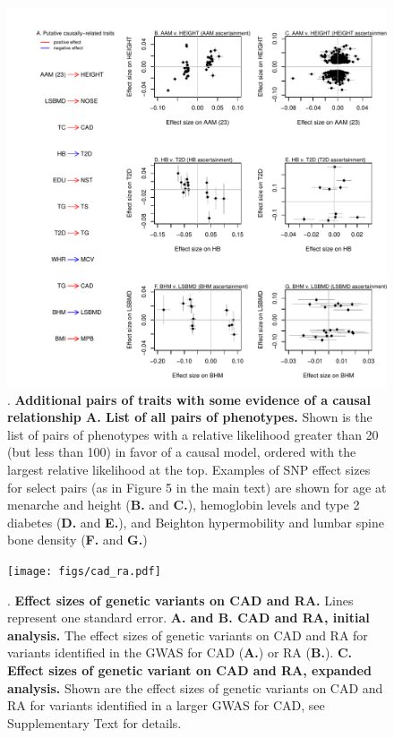 \documentclass[11pt,titlepage]{article}
\begin{document}
\begin{figure}
\begin{center}
\includegraphics[scale = 0.8]{figs/causal_supp.pdf}
\caption{. \textbf{Additional pairs of traits with some evidence of a causal relationship A. List of all pairs of phenotypes.} Shown is the list of pairs of phenotypes with a relative likelihood greater than 20 (but less than 100) in favor of a causal model, ordered with the largest relative likelihood at the top. Examples of SNP effect sizes for select pairs (as in Figure 5 in the main text) are shown for age at menarche and height (\textbf{B.} and \textbf{C.}), hemoglobin levels and type 2 diabetes (\textbf{D.} and \textbf{E.}), and Beighton hypermobility and lumbar spine bone density (\textbf{F.} and \textbf{G.}) }\label{f_causal_supp}
\end{center}
\end{figure}

\begin{figure}
\begin{center}
\texttt{[image: figs/cad\_ra.pdf]}
\caption{. \textbf{Effect sizes of genetic variants on CAD and RA.} Lines represent one standard error. \textbf{A. and B. CAD and RA, initial analysis.} The effect sizes of genetic variants on CAD and RA for variants identified in the GWAS for CAD (\textbf{A.}) or RA (\textbf{B.}). \textbf{C. Effect sizes of genetic variant on CAD and RA, expanded analysis.} Shown are the effect sizes of genetic variants on CAD and RA for variants identified in a larger GWAS for CAD, see Supplementary Text for details.} \label{f_cad_ra}
\end{center}
\end{figure}
\end{document}

